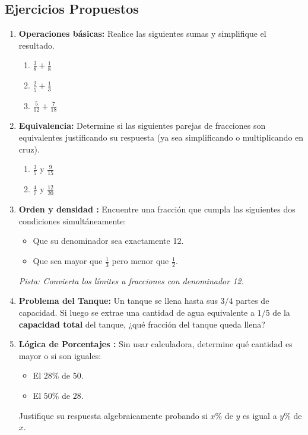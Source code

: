 \subsection*{Ejercicios Propuestos}

\begin{enumerate}
    \item \textbf{Operaciones básicas:}
    Realice las siguientes sumas y simplifique el resultado.
    \begin{enumerate}
        \item $\frac{3}{8} + \frac{1}{8}$
        \item $\frac{2}{5} + \frac{1}{3}$
        \item $\frac{5}{12} + \frac{7}{18}$
    \end{enumerate}
    
    \item \textbf{Equivalencia:}
    Determine si las siguientes parejas de fracciones son equivalentes justificando su respuesta (ya sea simplificando o multiplicando en cruz).
    \begin{enumerate}
        \item $\frac{3}{5}$ y $\frac{9}{15}$
        \item $\frac{4}{7}$ y $\frac{12}{20}$
    \end{enumerate}

    \item \textbf{Orden y densidad :}
    Encuentre una fracción que cumpla las siguientes dos condiciones simultáneamente:
    \begin{itemize}
        \item Que su denominador sea exactamente 12.
        \item Que sea mayor que $\frac{1}{3}$ pero menor que $\frac{1}{2}$.
    \end{itemize}
    \textit{Pista: Convierta los límites a fracciones con denominador 12.}

    \item \textbf{Problema del Tanque:}
    Un tanque se llena hasta sus $3/4$ partes de capacidad. Si luego se extrae una cantidad de agua equivalente a $1/5$ de la \textbf{capacidad total} del tanque, ¿qué fracción del tanque queda llena?

    \item \textbf{Lógica de Porcentajes :}
    Sin usar calculadora, determine qué cantidad es mayor o si son iguales:
    \begin{itemize}
        \item El $28\%$ de $50$.
        \item El $50\%$ de $28$.
    \end{itemize}
    Justifique su respuesta algebraicamente probando si $x\%$ de $y$ es igual a $y\%$ de $x$.


\end{enumerate}
